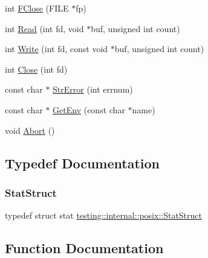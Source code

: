 \begin{DoxyCompactItemize}
int \mbox{\hyperlink{namespacetesting_1_1internal_1_1posix_af4beeaaa8d62916d5e3b644a1ddfbd6b}{F\+Close}} (F\+I\+LE $\ast$fp)
\item 
int \mbox{\hyperlink{namespacetesting_1_1internal_1_1posix_a3c6ab13e581a56f1b02f3eb7536c97fd}{Read}} (int fd, void $\ast$buf, unsigned int count)
\item 
int \mbox{\hyperlink{namespacetesting_1_1internal_1_1posix_af4acf9f78d55f815a18b43786511abef}{Write}} (int fd, const void $\ast$buf, unsigned int count)
\item 
int \mbox{\hyperlink{namespacetesting_1_1internal_1_1posix_a15e5b8f2a535ef1b2529b85b861e4846}{Close}} (int fd)
\item 
const char $\ast$ \mbox{\hyperlink{namespacetesting_1_1internal_1_1posix_a4b77b14af6f4d18f83d303b98e9349c4}{Str\+Error}} (int errnum)
\item 
const char $\ast$ \mbox{\hyperlink{namespacetesting_1_1internal_1_1posix_a1d5e3da5a27eed25986859fa83cafe95}{Get\+Env}} (const char $\ast$name)
\item 
void \mbox{\hyperlink{namespacetesting_1_1internal_1_1posix_a69b8278c59359dd6a6f941b4643db9fb}{Abort}} ()
\end{DoxyCompactItemize}


\subsection{Typedef Documentation}
\mbox{\label{namespacetesting_1_1internal_1_1posix_a8eb9f08d3af29941c2d2a964cfff3ecb}} 
\subsubsection{\texorpdfstring{StatStruct}{StatStruct}}
{\footnotesize\ttfamily typedef struct stat \mbox{\hyperlink{namespacetesting_1_1internal_1_1posix_a8eb9f08d3af29941c2d2a964cfff3ecb}{testing\+::internal\+::posix\+::\+Stat\+Struct}}}



\subsection{Function Documentation}
\mbox{\label{namespacetesting_1_1internal_1_1posix_a69b8278c59359dd6a6f941b4643db9fb}} 
